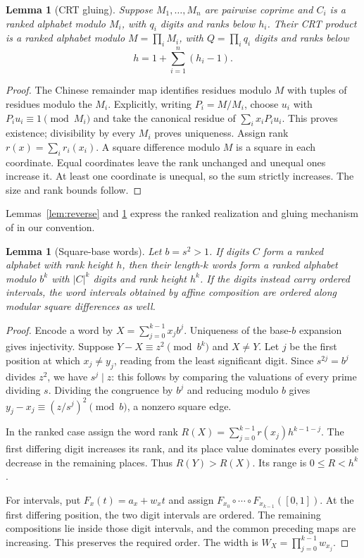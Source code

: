 \documentclass[11pt]{article}
\newtheorem{lemma}[theorem]{Lemma}
\theoremstyle{definition}
\theoremstyle{remark}
\newcommand{\card}[1]{\lvert #1\rvert}
\begin{document}
\begin{lemma}[CRT gluing]\label{lem:crt}
Suppose $M_1,\ldots,M_n$ are pairwise coprime and $C_i$ is a ranked
alphabet modulo $M_i$, with $q_i$ digits and ranks below $h_i$.
Their CRT product is a ranked alphabet modulo $M=\prod_iM_i$, with
$Q=\prod_iq_i$ digits and ranks below
\[
 h=1+\sum_{i=1}^n(h_i-1).
\]
\end{lemma}
\begin{proof}
The Chinese remainder map identifies residues modulo $M$ with tuples of
residues modulo the $M_i$. Explicitly, writing $P_i=M/M_i$, choose
$u_i$ with $P_iu_i\equiv1\pmod{M_i}$ and take the canonical residue of
$\sum_i x_iP_iu_i$. This proves existence; divisibility by every $M_i$
proves uniqueness. Assign rank $r(x)=\sum_ir_i(x_i)$. A square difference
modulo $M$ is a square in each coordinate. Equal coordinates leave the rank
unchanged and unequal ones increase it. At least one coordinate is unequal,
so the sum strictly increases. The size and rank bounds follow.
\end{proof}
Lemmas~\ref{lem:reverse} and \ref{lem:crt} express the ranked realization
and gluing mechanism of \cite[Lemmas 4--5]{Krachun2026} in our convention.

\begin{lemma}[Square-base words]\label{lem:words}
Let $b=s^2>1$. If digits $C$ form a ranked alphabet with rank height $h$,
then their length-$k$ words form a ranked alphabet modulo $b^k$ with
$\card C^k$ digits and rank height $h^k$. If the digits instead carry
ordered intervals, the word intervals obtained by affine composition are
ordered along modular square differences as well.
\end{lemma}
\begin{proof}
Encode a word by $X=\sum_{j=0}^{k-1}x_jb^j$. Uniqueness of the base-$b$
expansion gives injectivity. Suppose $Y-X\equiv z^2\pmod{b^k}$ and $X\ne Y$.
Let $j$ be the first position at which $x_j\ne y_j$, reading from the
least significant digit. Since $s^{2j}=b^j$ divides $z^2$, we have
$s^j\mid z$: this follows by comparing the valuations of every prime
dividing $s$. Dividing the congruence by $b^j$ and reducing modulo $b$
gives $y_j-x_j\equiv(z/s^j)^2\pmod b$, a nonzero square edge.

In the ranked case assign the word rank
$R(X)=\sum_{j=0}^{k-1}r(x_j)h^{k-1-j}$. The first differing digit increases
its rank, and its place value dominates every possible decrease in the
remaining places. Thus $R(Y)>R(X)$. Its range is $0\le R<h^k$.

For intervals, put $F_x(t)=a_x+w_xt$ and assign
$F_{x_0}\circ\cdots\circ F_{x_{k-1}}([0,1])$. At the first differing
position, the two digit intervals are ordered. The remaining compositions
lie inside those digit intervals, and the common preceding maps are
increasing. This preserves the required order. The width is
$W_X=\prod_{j=0}^{k-1}w_{x_j}$.
\end{proof}
\end{document}
